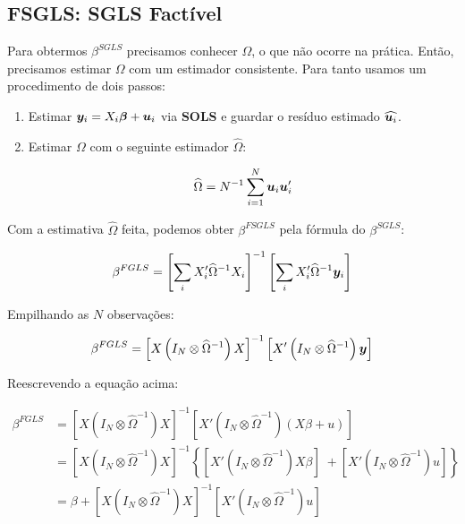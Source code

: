 \documentclass[11pt,oneside,a4paper]{article}
\numberwithin{equation}{section}
\begin{document}
\subsection*{FSGLS: SGLS Factível}

Para obtermos $\beta^{SGLS}$ precisamos conhecer $\Omega$, o que não ocorre na prática.
Então, precisamos estimar $\Omega$ com um estimador consistente.
Para tanto usamos um procedimento de dois passos:

\begin{enumerate}
\item  %
Estimar $\boldsymbol{y}_{i} = X_{i} \boldsymbol{\beta} + \boldsymbol{u}_{i}$ via \textbf{SOLS} e guardar o resíduo estimado $\widehat{\boldsymbol{u}_{i}}$.

\item  %
Estimar $\Omega$ com o seguinte estimador $\widehat{\Omega}$:

\vspace{-1.5 em}
\begin{align*}
	\widehat{\Omega} 
	= 
	N^{-1} \sum_{i=1}^{N} \boldsymbol{u}_{i} \boldsymbol{u}_{i}'
\end{align*}
\end{enumerate}

Com a estimativa $\widehat{\Omega}$ feita, podemos obter $\beta^{FSGLS}$ pela fórmula do $\beta^{SGLS}$:

\vspace{-1.5 em}
\begin{align*}
	\beta^{FGLS}
	= 
	\left[ 
		\sum_{i} X_{i}' \widehat{\Omega}^{-1} X_{i}
	\right]^{-1}
	\left[ 
		\sum_{i} X_{i}' \widehat{\Omega}^{-1} \boldsymbol{y}_{i}
	\right]
\end{align*}

Empilhando as $N$ observações:

\vspace{-1.5 em}
\begin{align*}
\beta^{FGLS}
= 
\left[ X \left( I_{N} \otimes \widehat{\Omega}^{-1} \right) X \right]^{-1}
\left[ X' \left( I_{N} \otimes \widehat{\Omega}^{-1} \right) \boldsymbol{y} \right]
\end{align*}

Reescrevendo a equação acima:

\vspace{-1.5 em}
\begin{align*}
\beta^{FGLS}
&= 
\left[  X \left( I_{N} \otimes \widehat{\Omega}^{-1} \right) X \right]^{-1}
\left[  X' \left( I_{N} \otimes \widehat{\Omega}^{-1} \right) (X \beta + u) \right]
\\
&= 
\left[ X \left( I_{N} \otimes \widehat{\Omega}^{-1} \right) X \right]^{-1}
\left\{ 
\left[ X' \left( I_{N} \otimes \widehat{\Omega}^{-1} \right) X \beta \right]
\; +
\left[ X' \left( I_{N} \otimes \widehat{\Omega}^{-1} \right) u \right]
\right\}
\\
&= 
\beta +
\left[ X \left( I_{N} \otimes \widehat{\Omega}^{-1} \right) X \right]^{-1}
\left[ X' \left( I_{N} \otimes \widehat{\Omega}^{-1} \right) u \right]
\end{align*}
\end{document}
